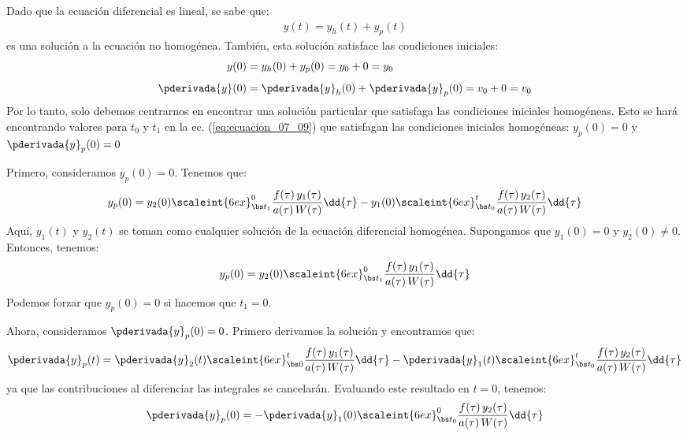 Dado que la ecuación diferencial es lineal, se sabe que:
\begin{align*}
y (t) = y_{h} (t) + y_{p} (t)
\end{align*}
es una solución a la ecuación no homogénea. También, esta solución satisface las condiciones iniciales:
\begin{align*}
y (0) &= y_{h} (0) + y_{p} (0) = y_{0} + 0 = y_{0} \\[0.5em]
\pderivada{y} (0) &= \pderivada{y}_{h} (0) + \pderivada{y}_{p} (0) = v_{0} + 0 = v_{0}
\end{align*}
Por lo tanto, solo debemos centrarnos en encontrar una solución particular que satisfaga las condiciones iniciales homogéneas. Esto se hará encontrando valores para $t_{0}$ y $t_{1}$ en la ec. (\ref{eq:ecuacion_07_09}) que satisfagan las condiciones iniciales homogéneas: $y_{p} (0) = 0$ y $\pderivada{y}_{p} (0) = 0$
\par
Primero, consideramos $y_{p} (0) = 0$. Tenemos que:
\begin{align}
y_{p} (0) = y_{2} (0) \scaleint{6ex}_{\bs t_{1}}^{0} \dfrac{f (\tau) \, y_{1} (\tau)}{a (\tau) \, W (\tau)} \dd{\tau} - y_{1} (0) \scaleint{6ex}_{\bs t_{0}}^{t} \dfrac{f (\tau) \, y_{2} (\tau)}{a (\tau) \, W (\tau)} \dd{\tau}
\label{eq:ecuacion_07_15}
\end{align}
Aquí, $y_{1} (t)$ y $y_{2} (t)$ se toman como cualquier solución de la ecuación diferencial homogénea. Supongamos que $y_{1} (0) = 0$ y $y_{2} (0) \neq 0$. Entonces, tenemos:
\begin{align}
y_{p} (0) = y_{2} (0) \scaleint{6ex}_{\bs t_{1}}^{0} \dfrac{f (\tau) \, y_{1} (\tau)}{a (\tau) \, W (\tau)} \dd{\tau}
\label{eq:ecuacion_07_16}
\end{align}
Podemos forzar que $y_{p} (0) = 0$ si hacemos que $t_{1} = 0$.
\par
Ahora, consideramos $\pderivada{y}_{p} (0) = 0$. Primero derivamos la solución y encontramos que:
\begin{align}
\pderivada{y}_{p} (t) = \pderivada{y}_{2} (t) \scaleint{6ex}_{\bs 0}^{t} \dfrac{f (\tau) \, y_{1} (\tau)}{a (\tau) \, W (\tau)} \dd{\tau} - \pderivada{y}_{1} (t) \scaleint{6ex}_{\bs t_{0}}^{t} \dfrac{f (\tau) \, y_{2} (\tau)}{a (\tau) \, W (\tau)} \dd{\tau}
\label{eq:ecuacion_07_17}
\end{align}
ya que las contribuciones al diferenciar las integrales se cancelarán. Evaluando este resultado en $t = 0$, tenemos:
\begin{align}
\pderivada{y}_{p} (0) = - \pderivada{y}_{1} (0) \scaleint{6ex}_{\bs t_{0}}^{0} \dfrac{f (\tau) \, y_{2} (\tau)}{a (\tau) \, W (\tau)} \dd{\tau}
\label{eq:ecuacion_07_18}
\end{align}
